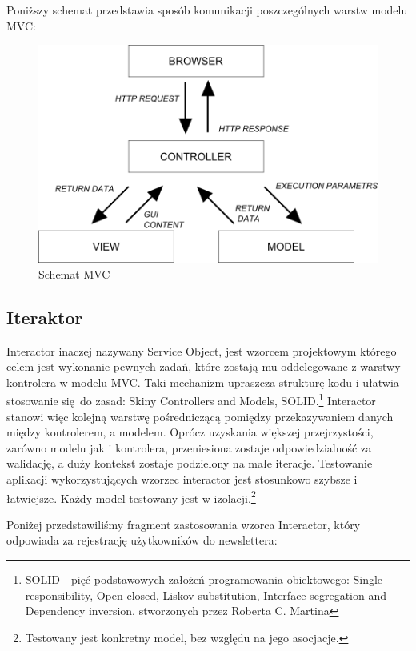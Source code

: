     Poniższy schemat przedstawia sposób komunikacji poszczególnych warstw modelu MVC:
    \begin{figure}[h]
      \centering
      \includegraphics[scale=0.87]{images/mvc_model.png}
      \caption{Schemat MVC}
    \end{figure}
  \subsection{Iteraktor}
  Interactor inaczej nazywany Service Object, jest wzorcem projektowym którego celem jest
  wykonanie pewnych zadań, które zostają mu oddelegowane z warstwy kontrolera w modelu MVC. Taki mechanizm upraszcza strukturę kodu i ułatwia stosowanie się do zasad: Skiny Controllers and Models, SOLID.\footnote{SOLID - pięć podstawowych założeń programowania obiektowego: Single responsibility, Open-closed, Liskov substitution, Interface segregation and Dependency inversion,  stworzonych przez Roberta C. Martina}
  Interactor stanowi więc kolejną warstwę pośredniczącą pomiędzy przekazywaniem danych między kontrolerem, a modelem. Oprócz uzyskania większej przejrzystości, zarówno modelu jak i kontrolera, przeniesiona zostaje odpowiedzialność za walidację, a duży kontekst zostaje podzielony na małe iteracje. Testowanie aplikacji wykorzystujących wzorzec interactor jest stosunkowo szybsze i łatwiejsze. Każdy model testowany jest w izolacji.\footnote{Testowany jest konkretny model, bez względu na jego asocjacje.}

  Poniżej przedstawiliśmy fragment zastosowania wzorca Interactor, który odpowiada za rejestrację użytkowników do newslettera:\\
  
